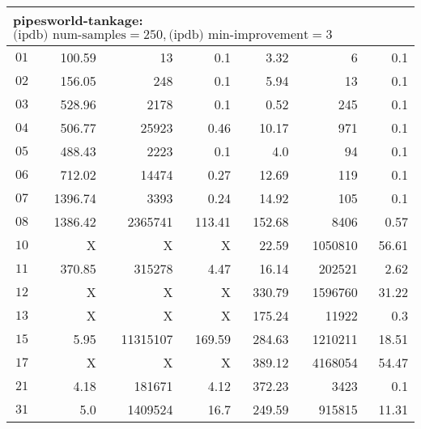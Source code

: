 \begin{longtable}{|c||r|r|r||r|r|r|}
\multicolumn{7}{|l|}{pipesworld-tankage: $\text{(ipdb) num-samples}=250,\text{(ipdb) min-improvement}=3$}\\\hline
$01$ & 100.59 & 13 & 0.1 &3.32 & 6 & 0.1 \\\hline
$02$ & 156.05 & 248 & 0.1 &5.94 & 13 & 0.1 \\\hline
$03$ & 528.96 & 2178 & 0.1 &0.52 & 245 & 0.1 \\\hline
$04$ & 506.77 & 25923 & 0.46 &10.17 & 971 & 0.1 \\\hline
$05$ & 488.43 & 2223 & 0.1 &4.0 & 94 & 0.1 \\\hline
$06$ & 712.02 & 14474 & 0.27 &12.69 & 119 & 0.1 \\\hline
$07$ & 1396.74 & 3393 & 0.24 &14.92 & 105 & 0.1 \\\hline
$08$ & 1386.42 & 2365741 & 113.41 &152.68 & 8406 & 0.57 \\\hline
$10$ & X & X & X &22.59 & 1050810 & 56.61 \\\hline
$11$ & 370.85 & 315278 & 4.47 &16.14 & 202521 & 2.62 \\\hline
$12$ & X & X & X &330.79 & 1596760 & 31.22 \\\hline
$13$ & X & X & X &175.24 & 11922 & 0.3 \\\hline
$15$ & 5.95 & 11315107 & 169.59 &284.63 & 1210211 & 18.51 \\\hline
$17$ & X & X & X &389.12 & 4168054 & 54.47 \\\hline
$21$ & 4.18 & 181671 & 4.12 &372.23 & 3423 & 0.1 \\\hline
$31$ & 5.0 & 1409524 & 16.7 &249.59 & 915815 & 11.31 \\\hline


\end{longtable}
